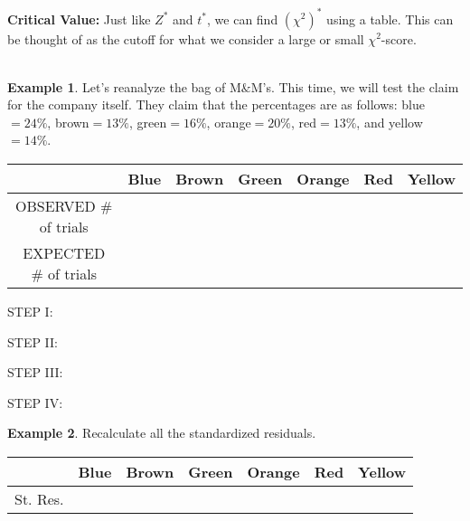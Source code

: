 \documentclass[12pt]{amsart}
\theoremstyle{definition}
\newtheorem{ex}{Example}
\begin{document}
\newpage
\noindent \textbf{Critical Value:} Just like $Z^*$ and $t^*$, we can find $(\chi^2)^*$ using a table. This can be thought of as the cutoff for what we consider a large or small $\chi^2$-score.\\
~\\
\begin{ex} Let's reanalyze the bag of M$\&$M's. This time, we will test the claim for the company itself. They claim that the percentages are as follows: blue$=24\%$, brown$=13\%$, green$=16\%$, orange$=20\%$, red$=13\%$, and yellow$=14\%$.
\end{ex}
\begin{center}
\begin{tabular}{c|c|c|c|c|c|c}
 & Blue& Brown& Green& Orange& Red& Yellow\\\hline
OBSERVED $\#$ of trials &  &  &  &  &  & \\ \hline
EXPECTED $\#$ of trials & & & & & &
\end{tabular}
\end{center}
\vspace{0.1in}

\noindent STEP I:
\vspace{0.2in}

\noindent STEP II:
\vfill

\noindent STEP III:
\vfill

\noindent STEP IV:
\vspace{0.5in}

\begin{ex} Recalculate all the standardized residuals.
\end{ex}
\begin{center}
\begin{tabular}{c|c|c|c|c|c|c}
 & Blue& Brown& Green& Orange& Red& Yellow\\\hline
St. Res. &  &  &  &  &  & \\
\end{tabular}
\end{center}
\vspace{0.3in}
\end{document}
